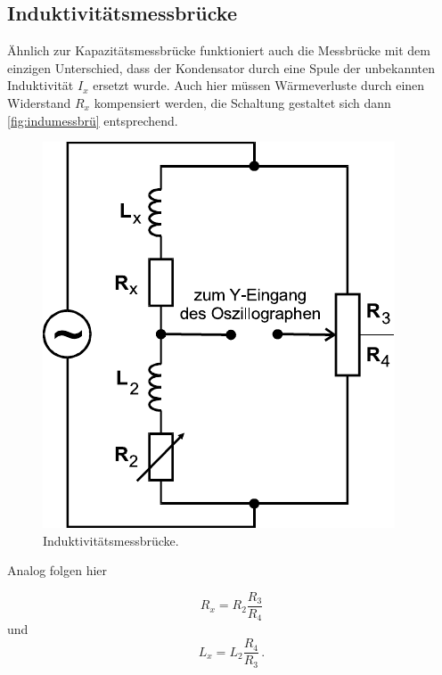 \subsection{Induktivitätsmessbrücke}
\label{subsec:indumessbrü}

Ähnlich zur Kapazitätsmessbrücke funktioniert auch die Messbrücke mit dem einzigen Unterschied, dass der Kondensator durch eine Spule der unbekannten Induktivität $I_x$ ersetzt wurde.
Auch hier müssen Wärmeverluste durch einen Widerstand $R_x$ kompensiert werden, die Schaltung gestaltet sich dann \autoref{fig:indumessbrü} entsprechend.

\begin{figure}[H]
    \centering
    \includegraphics{figures/Induktivitätsmessbrücke.pdf}
    \caption{Induktivitätsmessbrücke\cite{ap07}.}
    \label{fig:indumessbrü}
\end{figure}

Analog folgen hier

\begin{equation}
    R_x = R_2 \frac{R_3}{R_4}
\end{equation}
und
\begin{equation}
    L_x = L_2 \frac{R_4}{R_3}\,.
\end{equation}


